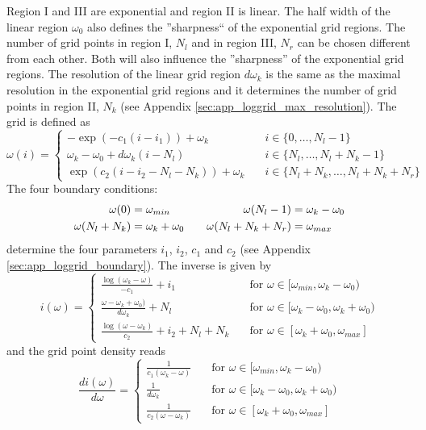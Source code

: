	Region I and III are exponential and region II is linear. The half width of the linear region $\omega_0$ also defines the ''sharpness`` of the exponential grid regions. The number of grid points in region I, $N_l$ and in region III, $N_r$ can be chosen different from each other. Both will also influence the ''sharpness'' of the exponential grid regions. The resolution of the linear grid region $d\omega_k$ is the same as the maximal resolution in the exponential grid regions and it determines the number of grid points in region II, $N_k$ (see Appendix \ref{sec:app_loggrid_max_resolution}). The grid is defined as
\begin{equation}\label{eqn:loggrid_definition}
	\omega(i)=\begin{cases}
		-\exp(-c_1(i-i_1)) + \omega_k 		\quad & i\in\{0,\dots,N_l-1\} \\ 
		\omega_k-\omega_0+d\omega_k(i-N_l)	\quad & i\in\{N_l,\dots,N_l+N_k-1\} \\ 
		\exp(c_2(i-i_2-N_l-N_k)) + \omega_k 	\quad & i\in\{N_l+N_k,\dots,N_l+N_k+N_r\}
	\end{cases}
\end{equation}
The four boundary conditions:
\begin{align}\label{eqn:loggrid_boundary_conditions}
	\omega(0)&=\omega_{min} \quad &\omega(N_l-1)&=\omega_k-\omega_0 \notag \\
	\omega(N_l+N_k)&=\omega_k+\omega_0 \quad &\omega(N_l+N_k+N_r)&=\omega_{max}
\end{align}
determine the four parameters $i_1$, $i_2$, $c_1$ and $c_2$ (see Appendix \ref{sec:app_loggrid_boundary}). The inverse is given by
\[
	i(\omega)=\begin{cases}
		\frac{\log(\omega_k-\omega)}{-c_1} + i_1 \quad &\text{for } \omega\in[\omega_{min},\omega_k-\omega_0) \\
		\frac{\omega-\omega_k+\omega_0)}{d\omega_k} + N_l \quad &\text{for } \omega\in[\omega_k-\omega_0,\omega_k+\omega_0) \\
		\frac{\log(\omega-\omega_k)}{c_2} + i_2 + N_l + N_k \quad &\text{for } \omega\in[\omega_k+\omega_0, \omega_{max}]
	\end{cases}
\]
and the grid point density reads
\begin{equation}\label{eqn:loggrid_grid_point_density}
	\frac{di(\omega)}{d\omega}=\begin{cases}
		\frac{1}{c_1(\omega_k-\omega)} \quad &\text{for } \omega\in[\omega_{min},\omega_k-\omega_0) \\
		\frac{1}{d\omega_k} \quad &\text{for } \omega\in[\omega_k-\omega_0,\omega_k+\omega_0) \\
		\frac{1}{c_2(\omega-\omega_k)}  \quad &\text{for } \omega\in[\omega_k+\omega_0, \omega_{max}]
	\end{cases}
\end{equation}

